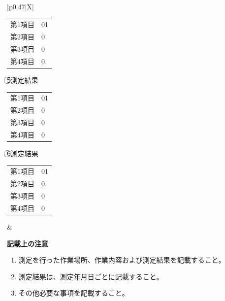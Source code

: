 \documentclass[UTF8,10pt,a4paper,fontset=fandol]{ctexart}
\newcommand{\fieldvalue}[1]{#1}
\newcommand{\handwritten}[1]{#1}
\begin{document}
\begin{tabularx}{\textwidth}{|p{0.47\textwidth}|X|}
{\begin{minipage}[t]{\linewidth}
\begin{tabularx}{\linewidth}{@{}lX@{}}
第1項目&
\fieldvalue{\handwritten{01}}\\
第2項目&
\fieldvalue{\handwritten{0}}\\
第3項目&
\fieldvalue{\handwritten{0}}\\
第4項目&
\fieldvalue{\handwritten{0}}\\
\end{tabularx}

\vspace{0.7em}
\textcircled{5}\quad 測定結果

\begin{tabularx}{\linewidth}{@{}lX@{}}
第1項目&
\fieldvalue{\handwritten{01}}\\
第2項目&
\fieldvalue{\handwritten{0}}\\
第3項目&
\fieldvalue{\handwritten{0}}\\
第4項目&
\fieldvalue{\handwritten{0}}\\
\end{tabularx}

\vspace{0.7em}
\textcircled{6}\quad 測定結果

\begin{tabularx}{\linewidth}{@{}lX@{}}
第1項目&
\fieldvalue{\handwritten{01}}\\
第2項目&
\fieldvalue{\handwritten{0}}\\
第3項目&
\fieldvalue{\handwritten{0}}\\
第4項目&
\fieldvalue{\handwritten{0}}\\
\end{tabularx}
\end{minipage}}
&
\begin{minipage}[t]{\linewidth}
\textbf{記載上の注意}

\begin{enumerate}
\item 測定を行った作業場所、作業内容および測定結果を記載すること。
\item 測定結果は、測定年月日ごとに記載すること。
\item その他必要な事項を記載すること。
\end{enumerate}


\end{minipage}
\end{tabularx}
\end{document}
